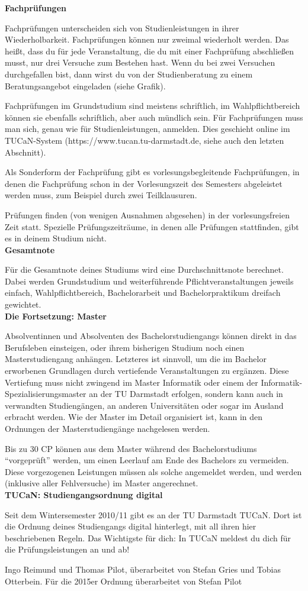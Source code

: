 {\noindent\textbf{Fachprüfungen}

Fachprüfungen unterscheiden sich von Studienleistungen in ihrer Wiederholbarkeit. Fachprüfungen können nur zweimal wiederholt werden. Das heißt, dass du für jede Veranstaltung, die du mit einer Fachprüfung abschließen musst, nur drei Versuche zum Bestehen hast. Wenn du bei zwei Versuchen durchgefallen bist, dann wirst du von der Studienberatung zu einem Beratungsangebot eingeladen (siehe Grafik).


Fachprüfungen im Grundstudium sind meistens schriftlich, im Wahlpflichtbereich können sie ebenfalls schriftlich, aber auch mündlich sein. Für Fachprüfungen muss man sich, genau wie für Studienleistungen, anmelden. Dies geschieht online im TUCaN-System (https://www.tucan.tu-darmstadt.de, siehe auch den letzten Abschnitt).

Als Sonderform der Fachprüfung gibt es vorlesungsbegleitende Fachprüfungen, in denen die Fachprüfung schon in der Vorlesungszeit des Semesters abgeleistet werden muss, zum Beispiel durch zwei Teilklausuren.

Prüfungen finden (von wenigen Ausnahmen abgesehen) in der vorlesungsfreien Zeit statt. Spezielle Prüfungszeiträume, in denen alle Prüfungen stattfinden, gibt es in deinem Studium nicht.\\

\noindent\textbf{Gesamtnote}

Für die Gesamtnote deines Studiums wird eine Durchschnittsnote berechnet. Dabei werden Grundstudium und weiterführende Pflichtveranstaltungen jeweils einfach, Wahlpflichtbereich, Bachelorarbeit und Bachelorpraktikum dreifach gewichtet.\\

\noindent\textbf{Die Fortsetzung: Master}

Absolventinnen und Absolventen des Bachelorstudiengangs können direkt in das Berufsleben einsteigen, oder ihrem bisherigen Studium noch einen Masterstudiengang anhängen. Letzteres ist sinnvoll, um die im Bachelor erworbenen Grundlagen durch vertiefende Veranstaltungen zu ergänzen. Diese Vertiefung muss nicht zwingend im Master Informatik oder einem der Informatik-Spezialisierungsmaster an der TU Darmstadt erfolgen, sondern kann auch in verwandten Studiengängen, an anderen Universitäten oder sogar im Ausland erbracht werden. Wie der Master im Detail organisiert ist, kann in den Ordnungen der Masterstudiengänge nachgelesen werden.

Bis zu 30 CP können aus dem Master während des Bachelorstudiums "`vorgeprüft"' werden, um einen Leerlauf am Ende des Bachelors zu vermeiden. Diese vorgezogenen Leistungen müssen als solche angemeldet werden, und werden (inklusive aller Fehlversuche) im Master angerechnet.\\

\noindent\textbf{TUCaN: Studiengangsordnung digital}

Seit dem Wintersemester 2010/11 gibt es an der TU Darmstadt TUCaN. Dort ist die Ordnung deines Studiengangs digital hinterlegt, mit all ihren hier beschriebenen Regeln. Das Wichtigste für dich: In TUCaN meldest du dich für die Prüfungsleistungen an und ab!
}
{Ingo Reimund und Thomas Pilot, überarbeitet von Stefan Gries und Tobias Otterbein. Für die 2015er Ordnung überarbeitet von Stefan Pilot}
